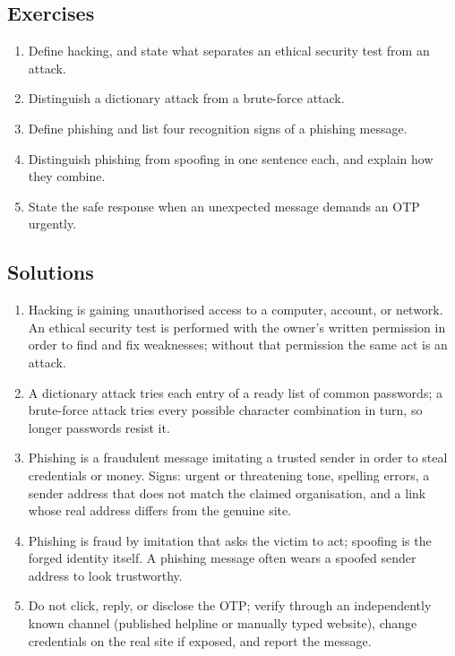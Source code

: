 \documentclass[11pt]{article}
\begin{document}
\subsection*{Exercises}
\begin{enumerate}[label=\arabic*.]
  \item Define hacking, and state what separates an ethical security
    test from an attack.
  \item Distinguish a dictionary attack from a brute-force attack.
  \item Define phishing and list four recognition signs of a phishing
    message.
  \item Distinguish phishing from spoofing in one sentence each, and
    explain how they combine.
  \item State the safe response when an unexpected message demands an
    OTP urgently.
\end{enumerate}

\subsection*{Solutions}
\begingroup\small
\begin{enumerate}[label=\arabic*.]
  \item Hacking is gaining unauthorised access to a computer, account,
    or network. An ethical security test is performed with the owner's
    written permission in order to find and fix weaknesses; without
    that permission the same act is an attack.
  \item A dictionary attack tries each entry of a ready list of common
    passwords; a brute-force attack tries every possible character
    combination in turn, so longer passwords resist it.
  \item Phishing is a fraudulent message imitating a trusted sender in
    order to steal credentials or money. Signs: urgent or threatening
    tone, spelling errors, a sender address that does not match the
    claimed organisation, and a link whose real address differs from
    the genuine site.
  \item Phishing is fraud by imitation that asks the victim to act;
    spoofing is the forged identity itself. A phishing message often
    wears a spoofed sender address to look trustworthy.
  \item Do not click, reply, or disclose the OTP; verify through an
    independently known channel (published helpline or manually typed
    website), change credentials on the real site if exposed, and
    report the message.
\end{enumerate}
\endgroup
\end{document}
